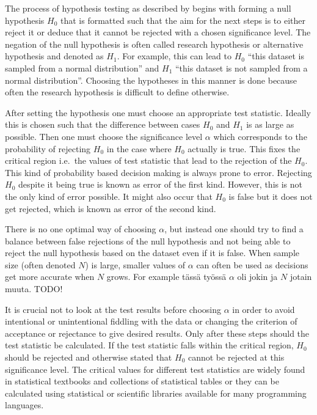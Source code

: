 \documentclass[english, oneside]{HYgradu}
\begin{document}
The process of hypothesis testing as described by \citet{bohm2010introduction} begins with forming a null hypothesis $H_0$ that is formatted such that the aim for the next steps is to either reject it or deduce that it cannot be rejected with a chosen significance level. The negation of the null hypothesis is often called research hypothesis or alternative hypothesis and denoted as $H_1$. For example, this can lead to $H_0$ ``this dataset is sampled from a normal distribution'' and $H_1$ ``this dataset is not sampled from a normal distribution''. Choosing the hypotheses in this manner is done because often the research hypothesis is difficult to define otherwise.

After setting the hypothesis one must choose an appropriate test statistic. Ideally this is chosen such that the difference between cases $H_0$ and $H_1$ is as large as possible. Then one must choose 
the significance level $\alpha$ which corresponds to the probability of rejecting $H_0$ in the case where $H_0$ actually is true. This fixes the critical region i.e.\ the values of test statistic that lead to the rejection of the $H_0$. This kind of probability based decision making is always prone to error. Rejecting $H_0$ despite it being true is known as error of the first kind. However, this is not the only kind of error possible. It might also occur that $H_0$ is false but it does not get rejected, which is known as error of the second kind.

There is no one optimal way of choosing $\alpha$, but instead one should try to find a balance between false rejections of the null hypothesis and not being able to reject the null hypothesis based on the dataset even if it is false. When sample size (often denoted $N$) is large, smaller values of $\alpha$ can often be used as decisions get more accurate when $N$ grows. For example tässä työssä $\alpha$ oli jokin ja $N$ jotain muuta. TODO! %

It is crucial not to look at the test results before choosing $\alpha$ in order to avoid intentional or unintentional fiddling with the data or changing the criterion of acceptance or rejectance to give desired results. Only after these steps should the test statistic be calculated. If the test statistic falls within the critical region, $H_0$ should be rejected and otherwise stated that $H_0$ cannot be rejected at this significance level. The critical values for different test statistics are widely found in statistical textbooks and collections of statistical tables or they can be calculated using statistical or scientific libraries available for many programming languages.
\end{document}
